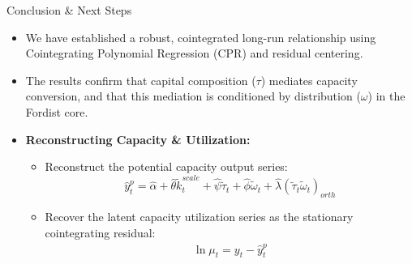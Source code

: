 \documentclass[10pt]{beamer}
\begin{document}
\begin{frame}{Conclusion \& Next Steps}
  \begin{itemize}
    \item We have established a robust, cointegrated long-run relationship using Cointegrating Polynomial Regression (CPR) and residual centering.
    \item The results confirm that capital composition ($\tau$) mediates capacity conversion, and that this mediation is conditioned by distribution ($\omega$) in the Fordist core.
    \item \textbf{Reconstructing Capacity \& Utilization:}
      \begin{itemize}
        \item Reconstruct the potential capacity output series:
          $$\hat{y}_t^p = \hat{\alpha} + \hat{\theta} \tilde{k}^{scale}_t + \hat{\psi} \tilde{\tau}_t + \hat{\phi} \tilde{\omega}_t + \hat{\lambda} (\tilde{\tau}_t \tilde{\omega}_t)_{orth}$$
        \item Recover the latent capacity utilization series as the stationary cointegrating residual:
          $$\widehat{\ln \mu_t} = y_t - \hat{y}_t^p$$
      \end{itemize}
  \end{itemize}
\end{frame}
\end{document}
